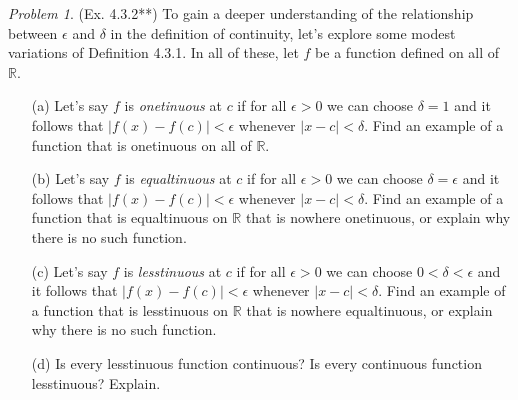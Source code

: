 \documentclass[11pt,twoside, reqno]{amsart}
\theoremstyle{remark}
\newtheorem{Prob}{Problem}
\def\R{\mathbb R}
\begin{document}
\begin{Prob}(Ex. 4.3.2**) To gain a deeper understanding of the relationship between $\epsilon$ and $\delta$ in the definition of continuity, let's explore some modest variations of Definition 4.3.1. In all of these, let $f$ be a function defined on all of $\R$.
\begin{enumerate}
    \item [(a)] Let's say $f$ is \textit{onetinuous} at $c$ if for all $\epsilon > 0$ we can choose $\delta = 1$ and it follows that $|f(x) - f(c)| < \epsilon$ whenever $|x-c| < \delta$. Find an example of a function that is onetinuous on all of $\R$.
    \item [(b)] Let's say $f$ is \textit{equaltinuous} at $c$ if for all $\epsilon > 0$ we can choose $\delta = \epsilon$ and it follows that $|f(x) - f(c)| < \epsilon$ whenever $|x-c| < \delta$. Find an example of a function that is equaltinuous on $\R$ that is nowhere onetinuous, or explain why there is no such function.
    \item [(c)] Let's say $f$ is \textit{lesstinuous} at $c$ if for all $\epsilon > 0$ we can choose $0 < \delta < \epsilon$ and it follows that $|f(x) - f(c)| < \epsilon$ whenever $|x-c| < \delta$. Find an example of a function that is lesstinuous on $\R$ that is nowhere equaltinuous, or explain why there is no such function.
    \item [(d)] Is every lesstinuous function continuous? Is every continuous function lesstinuous? Explain.
\end{enumerate}
\end{Prob}
\end{document}
